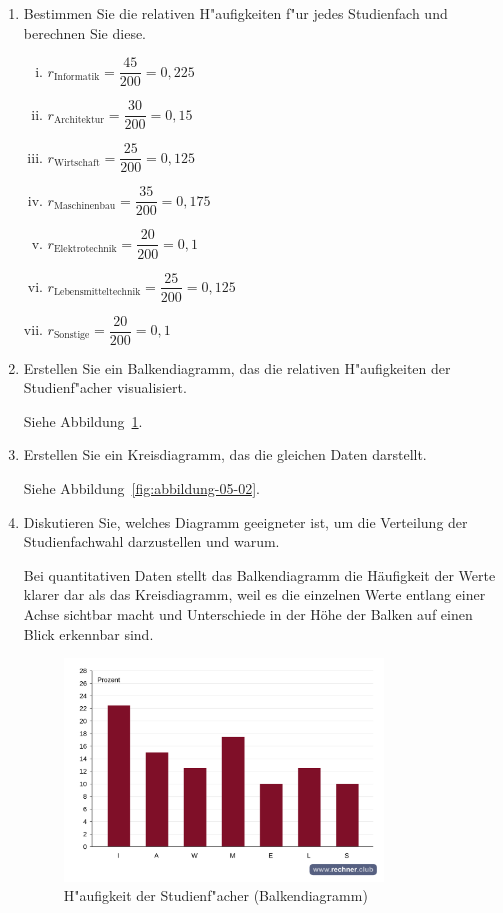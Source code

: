 \begin{enumerate}[1.]
    \item Bestimmen Sie die relativen H"aufigkeiten f"ur jedes Studienfach und
        berechnen Sie diese.

        \begin{enumerate}[i)]
            \item $r_{\text{Informatik}} = \dfrac{45}{200} = 0,225$
            \item $r_{\text{Architektur}} = \dfrac{30}{200} = 0,15$
            \item $r_{\text{Wirtschaft}} = \dfrac{25}{200} = 0,125$
            \item $r_{\text{Maschinenbau}} = \dfrac{35}{200} = 0,175$
            \item $r_{\text{Elektrotechnik}} = \dfrac{20}{200} = 0,1$
            \item $r_{\text{Lebensmitteltechnik}} = \dfrac{25}{200} = 0,125$
            \item $r_{\text{Sonstige}} = \dfrac{20}{200} = 0,1$
        \end{enumerate}
    \vspace{10pt}
    \item Erstellen Sie ein Balkendiagramm, das die relativen H"aufigkeiten der
        Studienf"acher visualisiert.

        Siehe Abbildung~\ref{fig:abbildung-05-01}.

    \item Erstellen Sie ein Kreisdiagramm, das die gleichen Daten darstellt.

        Siehe Abbildung~\ref{fig:abbildung-05-02}.

    \item Diskutieren Sie, welches Diagramm geeigneter ist, um die Verteilung
        der Studienfachwahl darzustellen und warum.

        Bei quantitativen Daten stellt das Balkendiagramm die
        Häufigkeit der Werte klarer dar als das Kreisdiagramm,
        weil es die einzelnen Werte entlang einer Achse sichtbar
        macht und Unterschiede in der Höhe der Balken auf einen
        Blick erkennbar sind.

    \begin{figure}[p]
        \centering
        \includegraphics[width=0.8\textwidth]{./assets/abbildung-05-01.png}
        \caption{H"aufigkeit der Studienf"acher (Balkendiagramm)}
        \label{fig:abbildung-05-01}
    \end{figure}


\end{enumerate}
